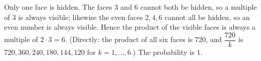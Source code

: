 Only one face is hidden. The faces $3$ and $6$ cannot both be hidden, so a multiple of $3$ is always visible; likewise the even faces $2,4,6$ cannot all be hidden, so an even number is always visible. Hence the product of the visible faces is always a multiple of $2\cdot3=6$. (Directly: the product of all six faces is $720$, and $\dfrac{720}{k}$ is $720,360,240,180,144,120$ for $k=1,\dots,6$.) The probability is $\boxed{1}$.
